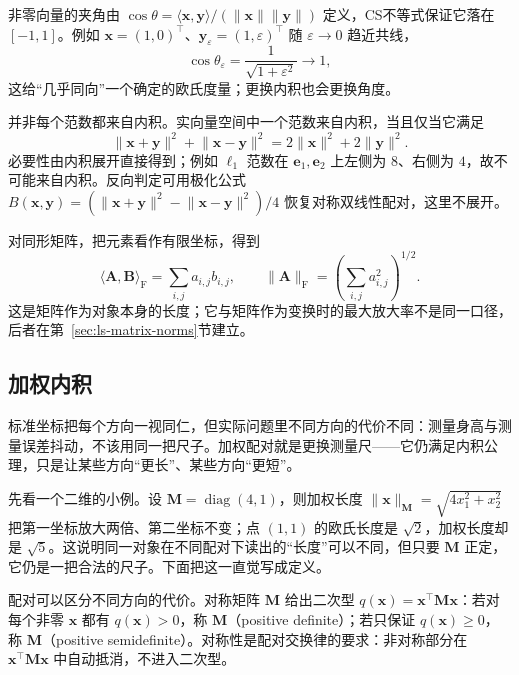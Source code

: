 非零向量的夹角由 $\cos\theta=\langle\bm x,\bm y\rangle/(\lVert\bm x\rVert\lVert\bm y\rVert)$ 定义，CS不等式保证它落在 $[-1,1]$。例如 $\bm x=(1,0)^\top$、$\bm y_\varepsilon=(1,\varepsilon)^\top$ 随 $\varepsilon\to0$ 趋近共线，
\begin{equation}
 \cos\theta_\varepsilon=\frac{1}{\sqrt{1+\varepsilon^2}}\longrightarrow1,
 \label{eq:linear-algebra-nearly-collinear-angle}
\end{equation}
这给“几乎同向”一个确定的欧氏度量；更换内积也会更换角度。

并非每个范数都来自内积。实向量空间中一个范数来自内积，当且仅当它满足
\begin{equation}
 \lVert\bm x+\bm y\rVert^2+\lVert\bm x-\bm y\rVert^2
 =2\lVert\bm x\rVert^2+2\lVert\bm y\rVert^2.
 \label{eq:functional-parallelogram-identity}
\end{equation}
必要性由内积展开直接得到；例如 $\ell_1$ 范数在 $\bm e_1,\bm e_2$ 上左侧为 $8$、右侧为 $4$，故不可能来自内积。反向判定可用极化公式 $B(\bm x,\bm y)=(\lVert\bm x+\bm y\rVert^2-\lVert\bm x-\bm y\rVert^2)/4$ 恢复对称双线性配对，这里不展开。

对同形矩阵，把元素看作有限坐标，得到
\[
 \langle\bm A,\bm B\rangle_{\mathrm F}=\sum_{i,j}a_{i,j}b_{i,j},
 \qquad
 \lVert\bm A\rVert_{\mathrm F}=\left(\sum_{i,j}a_{i,j}^2\right)^{1/2}.
\]
这是矩阵作为对象本身的长度；它与矩阵作为变换时的最大放大率不是同一口径，后者在第~\ref{sec:ls-matrix-norms}节建立。

\subsection{加权内积}
\label{sec:ls-weighted-inner-products}

标准坐标把每个方向一视同仁，但实际问题里不同方向的代价不同：测量身高与测量误差抖动，不该用同一把尺子。加权配对就是更换测量尺——它仍满足内积公理，只是让某些方向“更长”、某些方向“更短”。

先看一个二维的小例。设 $\bm M=\operatorname{diag}(4,1)$，则加权长度 $\lVert\bm x\rVert_{\bm M}=\sqrt{4x_1^2+x_2^2}$ 把第一坐标放大两倍、第二坐标不变；点 $(1,1)$ 的欧氏长度是 $\sqrt2$，加权长度却是 $\sqrt5$。这说明同一对象在不同配对下读出的“长度”可以不同，但只要 $\bm M$ 正定，它仍是一把合法的尺子。下面把这一直觉写成定义。

配对可以区分不同方向的代价。对称矩阵 $\bm M$ 给出二次型 $q(\bm x)=\bm x^\top\bm M\bm x$：若对每个非零 $\bm x$ 都有 $q(\bm x)>0$，称 $\bm M$（positive definite）；若只保证 $q(\bm x)\geq0$，称 $\bm M$（positive semidefinite）。对称性是配对交换律的要求：非对称部分在 $\bm x^\top\bm M\bm x$ 中自动抵消，不进入二次型。

